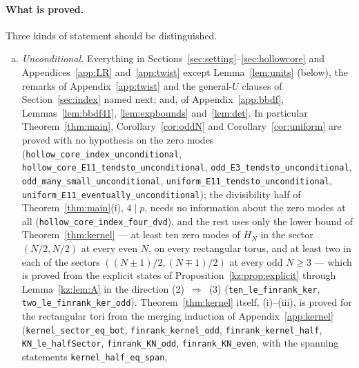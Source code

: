 \paragraph{What is proved.} Three kinds of statement should be distinguished.
\begin{enumerate}[(a)]
\item \begingroup\sloppy \emph{Unconditional.} Everything in Sections~\ref{sec:setting}--\ref{sec:hollowcore} and Appendices~\ref{app:LR}
and~\ref{app:twist} except Lemma~\ref{lem:units} (below), the remarks of Appendix~\ref{app:twist} and the general-$U$ clauses of
Section~\ref{sec:index} named next; and, of Appendix~\ref{app:bbdf}, Lemmas~\ref{lem:bbdf41}, \ref{lem:expbounds}
and~\ref{lem:det}. In particular Theorem~\ref{thm:main}, Corollary~\ref{cor:oddN} and Corollary~\ref{cor:uniform} are
proved with no hypothesis on the zero modes (\texttt{hollow\_\allowbreak{}core\_\allowbreak{}index\_\allowbreak{}unconditional},
\texttt{hollow\_\allowbreak{}core\_\allowbreak{}E11\_\allowbreak{}tendsto\_\allowbreak{}unconditional}, \texttt{odd\_\allowbreak{}E3\_\allowbreak{}tendsto\_\allowbreak{}unconditional},
\texttt{odd\_\allowbreak{}many\_\allowbreak{}small\_\allowbreak{}unconditional}, \texttt{uniform\_\allowbreak{}E11\_\allowbreak{}tendsto\_\allowbreak{}unconditional},
\texttt{uniform\_\allowbreak{}E11\_\allowbreak{}eventually\_\allowbreak{}unconditional}); the divisibility half of Theorem~\ref{thm:main}(i), $4\mid p$, needs no
information about the zero modes at all (\texttt{hollow\_\allowbreak{}core\_\allowbreak{}index\_\allowbreak{}four\_\allowbreak{}dvd}), and the rest uses only the lower bound of
Theorem~\ref{thm:kernel} --- at least ten zero modes of $H_N$ in the sector $(N/2,N/2)$ at every even $N$, on every rectangular
torus, and at least two in each of the sectors $((N\pm1)/2,(N\mp1)/2)$ at every odd $N\ge3$ --- which is proved from the explicit
states of Proposition~\ref{kz:prop:explicit} through Lemma~\ref{kz:lem:A} in the direction (2)~$\Rightarrow$~(3)
(\texttt{ten\_\allowbreak{}le\_\allowbreak{}finrank\_\allowbreak{}ker}, \texttt{two\_\allowbreak{}le\_\allowbreak{}finrank\_\allowbreak{}ker\_\allowbreak{}odd}). Theorem~\ref{thm:kernel} itself, (i)--(iii), is proved for the rectangular tori from the merging induction of Appendix~\ref{app:kernel}
(\texttt{kernel\_\allowbreak{}sector\_\allowbreak{}eq\_\allowbreak{}bot}, \texttt{finrank\_\allowbreak{}kernel\_\allowbreak{}odd}, \texttt{finrank\_\allowbreak{}kernel\_\allowbreak{}half}, \texttt{KN\_\allowbreak{}le\_\allowbreak{}halfSector},
\texttt{finrank\_\allowbreak{}KN\_\allowbreak{}odd}, \texttt{finrank\_\allowbreak{}KN\_\allowbreak{}even}, with the spanning statements \texttt{kernel\_\allowbreak{}half\_\allowbreak{}eq\_\allowbreak{}span},

\end{enumerate}
